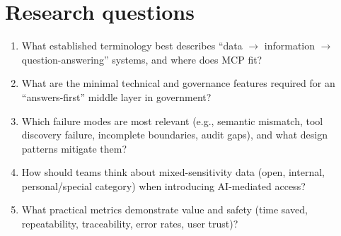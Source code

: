 \section{Research questions}

\begin{enumerate}[leftmargin=*]
  \item What established terminology best describes ``data $\rightarrow$ information $\rightarrow$ question-answering'' systems, and where does MCP fit?
  \item What are the minimal technical and governance features required for an ``answers-first'' middle layer in government?
  \item Which failure modes are most relevant (e.g., semantic mismatch, tool discovery failure, incomplete boundaries, audit gaps), and what design patterns mitigate them?
  \item How should teams think about mixed-sensitivity data (open, internal, personal/special category) when introducing AI-mediated access?
  \item What practical metrics demonstrate value and safety (time saved, repeatability, traceability, error rates, user trust)?
\end{enumerate}
